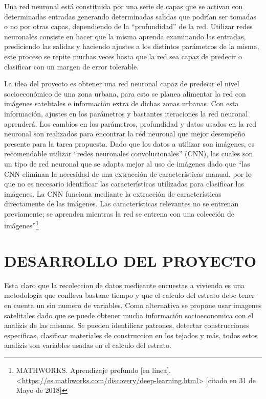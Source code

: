   

  Una red neuronal está constituida por una serie de capas que se activan con determinadas entradas generando determinadas salidas que podrían ser tomadas o no por otras capas, dependiendo de la “profundidad” de la red. Utilizar redes neuronales consiste en hacer que la misma aprenda examinando las entradas, prediciendo las salidas y haciendo ajustes a los distintos parámetros de la misma, este proceso se repite muchas veces hasta que la red sea capaz de predecir o clasificar con un margen de error tolerable.
  
  La idea del proyecto es obtener una red neuronal capaz de predecir el nivel socioeconómico de una zona urbana, para esto se planea alimentar la red con imágenes satelitales e información extra de dichas zonas urbanas. Con esta información, ajustes en los parámetros y bastantes iteraciones la red neuronal aprenderá. Los cambios en los parámetros, profundidad y datos usados en la red neuronal son realizados para encontrar la red neuronal que mejor desempeño presente para la tarea propuesta.
  Dado que los datos a utilizar son imágenes, es recomendable utilizar “redes neuronales convolucionales” (CNN), las cuales son un tipo de red neuronal que se adapta mejor al uso de imágenes dado que “las CNN eliminan la necesidad de una extracción de características manual, por lo que no es necesario identificar las características utilizadas para clasificar las imágenes. La CNN funciona mediante la extracción de características directamente de las imágenes. Las características relevantes no se entrenan previamente; se aprenden mientras la red se entrena con una colección de imágenes”\footnote[12]{MATHWORKS. Aprendizaje profundo [en línea]. <\url{https://es.mathworks.com/discovery/deep-learning.html}> [citado en 31 de Mayo de 2018]}
  
 
\newpage\chapter{DESARROLLO DEL PROYECTO}  
Esta claro que la recoleccion de datos medieante encuestas a vivienda es una metodologia que conlleva bastane tiempo y que el calculo del estrato debe tener en cuenta un sin numero de variables. Como alternativa se propone usar imagenes satelitales dado que se puede obtener mucha información socioeconomica con el analizis de las mismas. Se pueden identificar patrones, detectar construcciones especificas, clasificar materiales de construccion en los tejados y más, todos estos analizis son variables usadas en el calculo del estrato.
  
